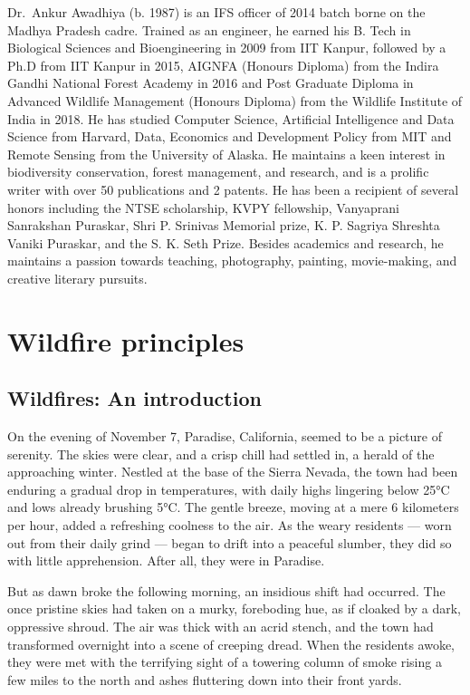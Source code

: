 \documentclass[
  12 pt,
]{Nemilov}
\begin{document}
Dr.~Ankur Awadhiya (b. 1987) is an IFS officer of 2014 batch borne on the Madhya Pradesh cadre. Trained as an engineer, he earned his B. Tech in Biological Sciences and Bioengineering in 2009 from IIT Kanpur, followed by a Ph.D from IIT Kanpur in 2015, AIGNFA (Honours Diploma) from the Indira Gandhi National Forest Academy in 2016 and Post Graduate Diploma in Advanced Wildlife Management (Honours Diploma) from the Wildlife Institute of India in 2018. He has studied Computer Science, Artificial Intelligence and Data Science from Harvard, Data, Economics and Development Policy from MIT and Remote Sensing from the University of Alaska. He maintains a keen interest in biodiversity conservation, forest management, and research, and is a prolific writer with over 50 publications and 2 patents. He has been a recipient of several honors including the NTSE scholarship, KVPY fellowship, Vanyaprani Sanrakshan Puraskar, Shri P. Srinivas Memorial prize, K. P. Sagriya Shreshta Vaniki Puraskar, and the S. K. Seth Prize. Besides academics and research, he maintains a passion towards teaching, photography, painting, movie-making, and creative literary pursuits.

\mainmatter

\part{Wildfire principles}\label{part-wildfire-principles}

\chapter{Wildfires: An introduction}\label{wildfires-an-introduction}

On the evening of November 7, Paradise, California, seemed to be a picture of serenity. The skies were clear, and a crisp chill had settled in, a herald of the approaching winter. Nestled at the base of the Sierra Nevada, the town had been enduring a gradual drop in temperatures, with daily highs lingering below 25°C and lows already brushing 5°C. The gentle breeze, moving at a mere 6 kilometers per hour, added a refreshing coolness to the air. As the weary residents --- worn out from their daily grind --- began to drift into a peaceful slumber, they did so with little apprehension. After all, they were in Paradise.

But as dawn broke the following morning, an insidious shift had occurred. The once pristine skies had taken on a murky, foreboding hue, as if cloaked by a dark, oppressive shroud. The air was thick with an acrid stench, and the town had transformed overnight into a scene of creeping dread. When the residents awoke, they were met with the terrifying sight of a towering column of smoke rising a few miles to the north and ashes fluttering down into their front yards.
\end{document}
